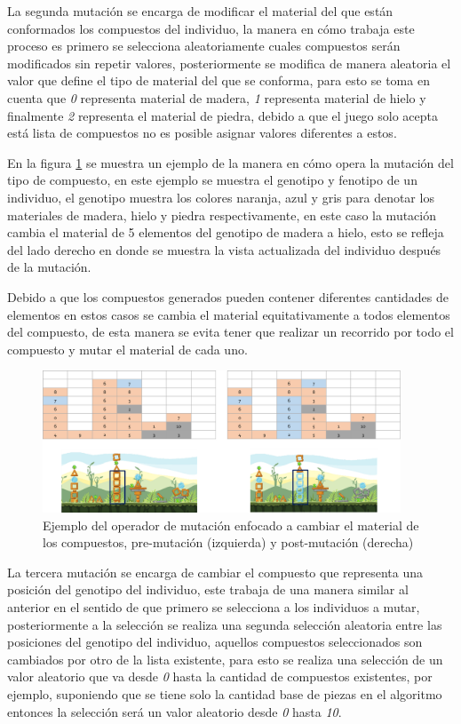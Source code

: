 La segunda mutación se encarga de modificar el material del que están
conformados los compuestos del individuo, la manera en cómo trabaja este proceso
es primero se selecciona aleatoriamente cuales compuestos serán modificados sin
repetir valores, posteriormente se modifica de manera aleatoria el valor que
define el tipo de material del que se conforma, para esto se toma en cuenta que
\textit{0} representa material de madera, \textit{1} representa material de
hielo y finalmente \textit{2} representa el material de piedra, debido a que el
juego solo acepta está lista de compuestos no es posible asignar valores
diferentes a estos.

En la figura \ref{figure:mutate_material} se muestra un ejemplo de la manera en
cómo opera la mutación del tipo de compuesto, en este ejemplo se muestra el
genotipo y fenotipo de un individuo, el genotipo muestra los colores naranja,
azul y gris para denotar los materiales de madera, hielo y piedra
respectivamente, en este caso la mutación cambia el material de 5 elementos del
genotipo de madera a hielo, esto se refleja del lado derecho en donde se muestra
la vista actualizada del individuo después de la mutación.

Debido a que los compuestos generados pueden contener diferentes cantidades de
elementos en estos casos se cambia el material equitativamente a todos elementos
del compuesto, de esta manera se evita tener que realizar un recorrido por todo
el compuesto y mutar el material de cada uno.

\begin{figure}
  \centering
  \includegraphics[width=0.95\textwidth]{img/mutation_material.png}
  \caption{Ejemplo del operador de mutación enfocado a cambiar el material de los compuestos, pre-mutación (izquierda) y post-mutación (derecha)}
  \label{figure:mutate_material}
\end{figure}

La tercera mutación se encarga de cambiar el compuesto que representa una
posición del genotipo del individuo, este trabaja de una manera similar al
anterior en el sentido de que primero se selecciona a los individuos a mutar,
posteriormente a la selección se realiza una segunda selección aleatoria entre
las posiciones del genotipo del individuo, aquellos compuestos seleccionados son
cambiados por otro de la lista existente, para esto se realiza una selección de
un valor aleatorio que va desde \textit{0} hasta la cantidad de compuestos
existentes, por ejemplo, suponiendo que se tiene solo la cantidad base de piezas
en el algoritmo entonces la selección será un valor aleatorio desde \textit{0}
hasta \textit{10}.

